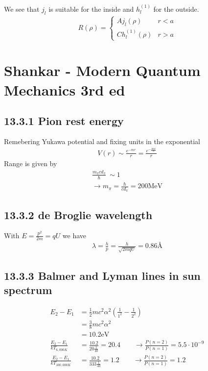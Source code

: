 \documentclass[../main.tex]{subfiles}
\begin{document}
We see that $j_l$ is suitable for the inside and $h^{(1)}_l$ for the outside.
\begin{align}
R(\rho)=\left\{\begin{matrix}
Aj_l(\rho) & r<a\\
Ch^{(1)}_l(\rho) & r>a
\end{matrix}\right.
\end{align}


\section{{\sc Shankar} - Modern Quantum Mechanics 3rd ed}
\subsection{13.3.1 Pion rest energy}
Remebering Yukawa potential and fixing units in the exponential
\begin{align}
V(r)\sim\frac{e^{-mr}}{r}=\frac{e^{-\frac{mcr}{\hbar}}}{r}
\end{align}
Range is given by
\begin{align}
\frac{m_\pi c d_\pi}{\hbar}~\sim1\\
\rightarrow m_\pi=\frac{\hbar}{cd_\pi}=200\text{MeV}
\end{align}

\subsection{13.3.2 de Broglie wavelength}
With $E=\frac{p^2}{2m}=qU$ we have
\begin{align}
\lambda
=\frac{h}{p}
=\frac{h}{\sqrt{2mqU}}
=0.86\text{\AA}
\end{align}

\subsection{13.3.3 Balmer and Lyman lines in sun spectrum}
\begin{align}
E_2-E_1
&=\frac{1}{2}mc^2\alpha^2\left(\frac{1}{1^2}-\frac{1}{2^2}\right)\\
&=\frac{3}{8}mc^2\alpha^2\\
&=10.2\text{eV}\\
\frac{E_2-E_1}{kT_{6,000K}}&=\frac{10.2}{20\frac{1}{40}}=20.4\qquad\rightarrow\frac{P(n=2)}{P(n=1)}=5.5\cdot10^{-9}\\
\frac{E_2-E_1}{kT_{100,000K}}&=\frac{10.2}{333\frac{1}{40}}=1.2\qquad\rightarrow\frac{P(n=2)}{P(n=1)}=1.2
\end{align}
\end{document}
